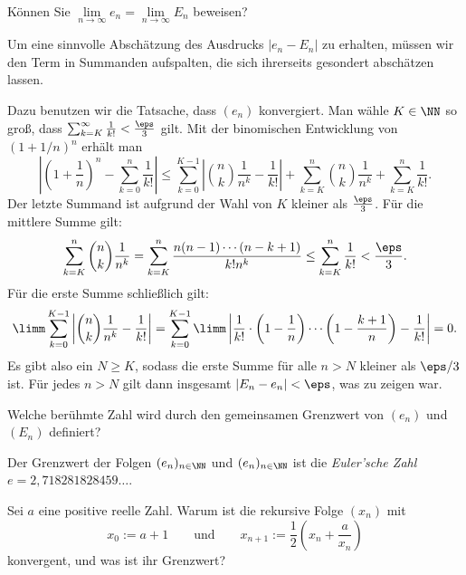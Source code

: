 \begin{frage}\label{02_edef}
  Können Sie $\lim\limits_{n\to\infty} e_n=\lim\limits_{n\to\infty} E_n$ 
  beweisen? 
\end{frage}

\begin{antwort}
  Um eine sinnvolle Abschätzung des Ausdrucks $|e_n-E_n|$ zu erhalten, 
  müssen wir den Term in Summanden aufspalten, die sich ihrerseits 
  gesondert abschätzen lassen. 

  Dazu benutzen wir die Tatsache, dass $(e_n)$ konvergiert. Man wähle 
  $K\in \NN$ so groß, dass $\sum_{k=K}^\infty \frac{1}{k!} < \frac{\eps}{3}$ 
  gilt. Mit der binomischen Entwicklung 
  von $(1+1/n)^n$ erhält man 
  \[
  \left| \left( 1+ \frac{1}{n} \right)^n - \sum_{k=0}^n \frac{1}{k!} \right|
  \le
  \sum_{k=0}^{K-1} \left| \binom{n}{k} \frac{1}{n^k} - \frac{1}{k!} \right|
  + \sum_{k=K}^n \binom{n}{k} \frac{1}{n^k} + 
  \sum_{k=K}^{n} \frac{1}{k!}.
  \]
  Der letzte Summand ist aufgrund der Wahl von $K$ kleiner als 
  $\frac{\eps}{3}$. Für die mittlere Summe gilt:
  \[
  \sum_{k=K}^n \binom{n}{k} \frac{1}{n^k} = 
  \sum_{k=K}^n \frac{n(n-1)\cdots (n-k+1)}{k!n^k} \le
  \sum_{k=K}^n \frac{1}{k!} < \frac{\eps}{3}.
  \]
  Für die erste Summe schließlich gilt:
  \[
  \limm \sum_{k=0}^{K-1} \left| \binom{n}{k} \frac{1}{n^k} - \frac{1}{k!} \right|
  =  \sum_{k=0}^{K-1} \limm
  \left| \frac{1}{k!} \cdot \left( 1-\frac{1}{n} \right )\cdots
    \left( 1-\frac{k+1}{n} \right ) -\frac{1}{k!} \right| = 0.
  \]
  Es gibt also ein $N \ge K$, sodass die erste Summe für alle $n>N$ kleiner 
  als $\eps/3$ ist. Für jedes $n>N$ gilt dann insgesamt 
  $|E_n-e_n| < \eps$, was zu zeigen war. 
\end{antwort}

\begin{frage}
  Welche berühmte Zahl wird durch den gemeinsamen 
  Grenzwert von $(e_n)$ und 
  $(E_n)$ definiert?
\end{frage}

\begin{antwort}
  Der Grenzwert der Folgen $(e_n)_{n\in\NN}$ und $(e_n)_{n\in\NN}$ ist 
  die \textit{Euler'sche Zahl}
  $e=2,718281828459\ldots$.
  \AntEnd
\end{antwort}

\begin{frage}\label{02_quaf}
  Sei $a$ eine positive reelle Zahl. Warum ist die rekursive Folge 
  $(x_n)$ mit 
  \[
  x_0 := a+1\qquad\text{und}\qquad x_{n+1}:= 
  \frac{1}{2} \left( x_n+\frac{a}{x_n} \right)
  \] 
  konvergent, und was ist ihr Grenzwert?
\end{frage}

